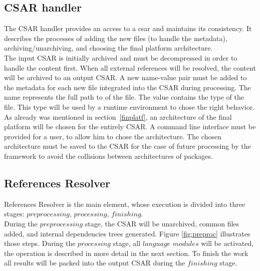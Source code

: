 \subsection{CSAR handler} \label{subs:casr_h}
The CSAR handler provides an access to a \gls{csar} and maintains its consistency. 
It describes the processes of adding the new files (to handle the metadata), \mbox{archiving/unarchiving}, and choosing the final platform architecture. \\
The input CSAR is initially archived and must be decompressed in order to handle the content first.
When all external references will be resolved, the content will be archived to an output CSAR.
A new name-value pair must be added to the metadata for each new file integrated into the CSAR during processing. 
The name represents the full path to of the file.
The value contains the type of the file. 
This type will be used by a runtime environment to chose the right behavior. %
As already was mentioned in section~\ref{finplatf}, an architecture of the final platform will be chosen for the entirely CSAR.
A command line interface must be provided for a user, to allow him to chose the architecture. 
The chosen architecture must be saved to the CSAR for the case of future processing by the framework to avoid the collisions between architectures of packages.

\subsection{References Resolver} \label{subs:RR}
References Resolver is the main element, whose execution is divided into three stages: $preprocessing$, $processing$, $finishing$. \\
During the $preprocessing$ stage, the CSAR will be unarchived, common files added, and internal dependencies trees generated.
Figure \ref{fig:preproc} illustrates those steps.
During the $processing$ stage, all $language$ $modules$ will be activated, the operation is described in more detail in the next section. %
To finish the work all results will be packed into the output CSAR during the $finishing$ stage.


